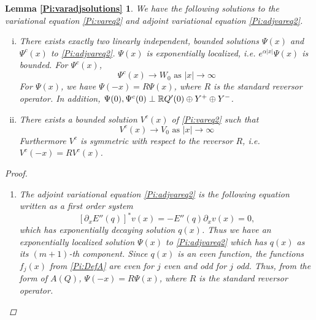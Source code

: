 \documentclass[thesis.tex]{subfiles}
\begin{document}
\newtheorem*{lemma:varadjsolutions}{Lemma \ref{Pi:varadjsolutions}}
\begin{lemma:varadjsolutions}
We have the following solutions to the variational equation \eqref{Pi:vareq2} and adjoint variational equation \eqref{Pi:adjvareq2}.

\begin{enumerate}[(i)]

\item There exists exactly two linearly independent, bounded solutions $\Psi(x)$ and $\Psi^c(x)$ to \eqref{Pi:adjvareq2}. $\Psi(x)$ is exponentially localized, i.e. $e^{\alpha |x|}\Psi(x)$ is bounded. For $\Psi^c(x)$,
	\begin{equation}
	\Psi^c(x) \rightarrow W_0 \text{ as }|x| \rightarrow \infty
	\end{equation}
For $\Psi(x)$, we have $\Psi(-x) = R \Psi(x)$, where $R$ is the standard reversor operator. In addition, $\Psi(0), \Psi^c(0) \perp {\mathbb R} Q'(0) \oplus Y^+ \oplus Y^-$.

\item There exists a bounded solution $V^c(x)$ of \eqref{Pi:vareq2} such that 
\begin{equation}
V^c(x) \rightarrow V_0 \text{ as }|x| \rightarrow \infty
\end{equation}
Furthermore $V^c$ is symmetric with respect to the reversor $R$, i.e. $V^c(-x) = R V^c(x)$.
\end{enumerate}

\begin{proof}
\begin{enumerate}
\item The adjoint variational equation \eqref{Pi:adjvareq2} is the following equation written as a first order system
\begin{equation}\label{adj2}
[\partial_x E''(q) ]^* v(x) = -E''(q) \partial_x v(x) = 0,
\end{equation}
which has exponentially decaying solution $q(x)$. Thus we have an exponentially localized solution $\Psi(x)$ to \eqref{Pi:adjvareq2} which has $q(x)$ as its $(m+1)$-th component. Since $q(x)$ is an even function, the functions $f_j(x)$ from \eqref{Pi:DefA} are even for $j$ even and odd for $j$ odd. Thus, from the form of $A(Q)$, $\Psi(-x) = R \Psi(x)$, where $R$ is the standard reversor operator.


\end{enumerate}
\end{proof}
\end{lemma:varadjsolutions}
\end{document}
